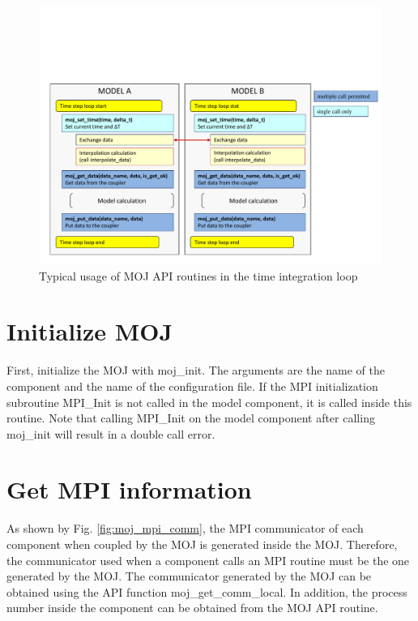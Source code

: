 \documentclass[11pt,a4paper]{report}
\newcommand{\figref}[1]{Fig. \ref{#1}}
\begin{document}
\begin{figure}[H]
\begin{center}
\includegraphics[bb = 0 0 750 400, scale=0.6, clip]{figs/moj_time_integ.pdf}
\caption{Typical usage of MOJ API routines in the time integration loop}
\label{fig:moj_time_integ}
\end{center}
\end{figure}

\section{Initialize MOJ}
First, initialize the MOJ with moj\_init. 
The arguments are the name of the component and the name of the configuration file. 
If the MPI initialization subroutine MPI\_Init is not called in the model component, it is called inside this routine. 
Note that calling MPI\_Init on the model component after calling moj\_init will result in a double call error.

\section{Get MPI information}
As shown by \figref{fig:moj_mpi_comm}, the MPI communicator of each component when coupled by the MOJ is generated inside the MOJ. Therefore, the communicator used when a component calls an MPI routine must be the one generated by the MOJ. 
The communicator generated by the MOJ can be obtained using the API function moj\_get\_comm\_local. 
In addition, the process number inside the component can be obtained from the MOJ API routine.
\end{document}
